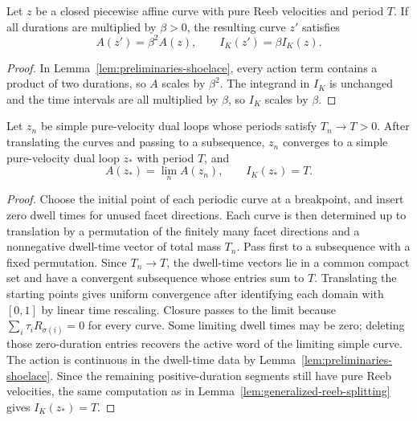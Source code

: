 \begin{lemma}[Rescaling]\label{lem:generalized-reeb-rescaling}
Let \(z\) be a closed piecewise affine curve with pure Reeb velocities and
period \(T\). If all durations are multiplied by \(\beta>0\), the resulting
curve \(z'\) satisfies
\[
  A(z')=\beta^2A(z),
  \qquad
  I_K(z')=\beta I_K(z).
\]
\end{lemma}

\begin{proof}
In Lemma~\ref{lem:preliminaries-shoelace}, every action term contains a
product of two durations, so \(A\) scales by \(\beta^2\). The integrand in
\(I_K\) is unchanged and the time intervals are all multiplied by \(\beta\), so
\(I_K\) scales by \(\beta\).
\end{proof}

\begin{lemma}\label{lem:generalized-reeb-compactness}
Let \(z_n\) be simple pure-velocity dual loops whose periods satisfy
\(T_n\to T>0\). After translating the curves and passing to a subsequence,
\(z_n\) converges to a simple pure-velocity dual loop \(z_*\) with period
\(T\), and
\[
  A(z_*)=\lim_n A(z_n),
  \qquad
  I_K(z_*)=T.
\]
\end{lemma}

\begin{proof}
Choose the initial point of each periodic curve at a breakpoint, and insert
zero dwell times for unused facet directions. Each curve is then determined up
to translation by a permutation of the finitely many facet directions and a
nonnegative dwell-time vector of total mass \(T_n\). Pass first to a
subsequence with a fixed permutation. Since \(T_n\to T\), the dwell-time
vectors lie in a common compact set and have a convergent subsequence whose
entries sum to \(T\). Translating the starting points gives uniform convergence
after identifying each domain with \([0,1]\) by linear time rescaling. Closure
passes to the limit because \(\sum_i\tau_iR_{\sigma(i)}=0\) for every curve.
Some limiting dwell times may be zero; deleting those zero-duration entries
recovers the active word of the limiting simple curve. The action is continuous in the dwell-time data by
Lemma~\ref{lem:preliminaries-shoelace}. Since the remaining positive-duration
segments still have pure Reeb velocities, the same computation as in
Lemma~\ref{lem:generalized-reeb-splitting} gives \(I_K(z_*)=T\).
\end{proof}

